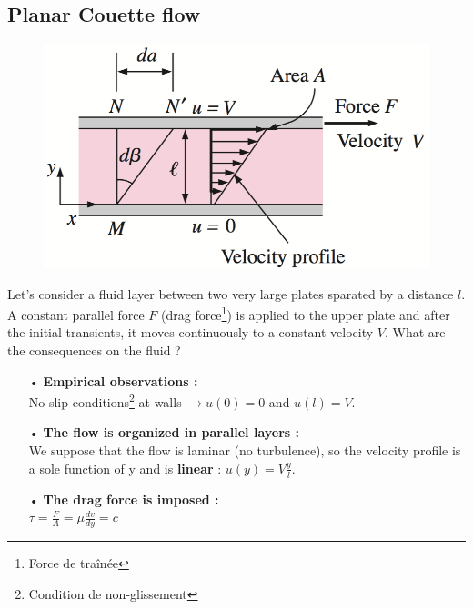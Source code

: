 \subsection{Planar Couette flow}
\begin{figure}
	\vspace{-5mm}
	\includegraphics[scale=0.4]{ch1/6}
\end{figure}
Let's consider a fluid layer between two very large plates sparated by a distance $l$. A constant parallel force $F$ (drag force\footnote{Force de traînée}) is applied to the upper plate and after the initial transients, it moves continuously to a constant velocity $V$. What are the consequences on the fluid ? \\
	
\begin{itemize}
	\item[•] \textbf{Empirical observations : }\\
	      No slip conditions\footnote{Condition de non-glissement} at walls $\rightarrow u(0) = 0$ and $u(l) = V$. \\
	\item[•] \textbf{The flow is organized in parallel layers :}\\
	      We suppose that the flow is laminar (no turbulence), so the velocity profile is a sole function of y and is \textbf{linear} : $u(y) = V\frac{y}{l}$.\\
	\item[•] \textbf{The drag force is imposed :} \\
	      $\tau = \frac{F}{A} = \mu \frac{dv}{dy} = c$
\end{itemize}
	
\newpage
	
